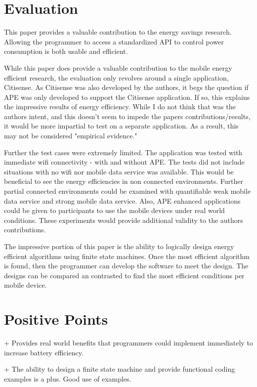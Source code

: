 \documentclass[conference]{IEEEtran}
\begin{document}
\section{Evaluation}
This paper provides a valuable contribution to the energy savings research. Allowing the programmer to access a standardized API to control power consumption is both usable and efficient. 

While this paper does provide a valuable contribution to the mobile energy efficient research, the evaluation only revolves around a single application, Citisense. As Citisense was also developed by the authors, it begs the question if APE was only developed to support the Citisense application. If so, this explains the impressive results of energy efficiency. While I do not think that was the authors intent, and this doesn't seem to impede the papers contributions/results, it would be more impartial to test on a separate application. As a result, this may not be considered "empirical evidence."

Further the test cases were extremely limited. The application was tested with immediate wifi connectivity - with and without APE. The tests did not include situations with no wifi nor mobile data service was available. This would be beneficial to see the energy efficiencies in non connected environments. Further partial connected environments could be examined with quantifiable weak mobile data service and strong mobile data service. Also, APE enhanced applications could be given to participants to use the mobile devices under real world conditions. These experiments would provide additional validity to the authors contributions. 

The impressive portion of this paper is the ability to logically design energy efficient algorithms using finite state machines. Once the most efficient algorithm is found, then the programmer can develop the software to meet the design. The designs can be compared an contrasted to find the most efficient conditions per mobile device. 

\section{Positive Points}
+ Provides real world benefits that programmers could implement immediately to increase battery efficiency. 

+ The ability to design a finite state machine and provide functional coding examples is a plus. Good use of examples.
\end{document}
